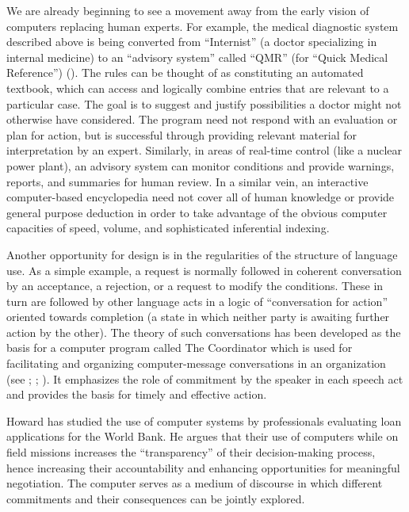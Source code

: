 \documentclass[12pt]{article}
\begin{document}
We are already beginning to see a movement away from the early vision of computers replacing human experts. For example, the medical diagnostic system described above is being converted from ``Internist'' (a doctor specializing in internal medicine) to an ``advisory system'' called ``QMR'' (for ``Quick Medical Reference'') (\cite{newquist1987}). The rules can be thought of as constituting an automated textbook, which can access and logically combine entries that are relevant to a particular case. The goal is to suggest and justify possibilities a doctor might not otherwise have considered. The program need not respond with an evaluation or plan for action, but is successful through providing relevant material for interpretation by an expert. Similarly, in areas of real-time control (like a nuclear power plant), an advisory system can monitor conditions and provide warnings, reports, and summaries for human review. In a similar vein, an interactive computer-based encyclopedia need not cover all of human knowledge or provide general purpose deduction in order to take advantage of the obvious computer capacities of speed, volume, and sophisticated inferential indexing.

Another opportunity for design is in the regularities of the structure of language use. As a simple example, a request is normally followed in coherent conversation by an acceptance, a rejection, or a request to modify the conditions. These in turn are followed by other language acts in a logic of ``conversation for action'' oriented towards completion (a state in which neither party is awaiting further action by the other). The theory of such conversations has been developed as the basis for a computer program called The Coordinator which is used for facilitating and organizing computer-message conversations in an organization (see \cite{flores1982}; \cite{winograd-flores-1986}; \cite{winograd1988}). It emphasizes the role of commitment by the speaker in each speech act and provides the basis for timely and effective action.

Howard has studied the use of computer systems by professionals evaluating loan applications for the World Bank. He argues that their use of computers while on field missions increases the ``transparency'' of their decision-making process, hence increasing their accountability and enhancing opportunities for meaningful negotiation. The computer serves as a medium of discourse in which different commitments and their consequences can be jointly explored.
\end{document}
